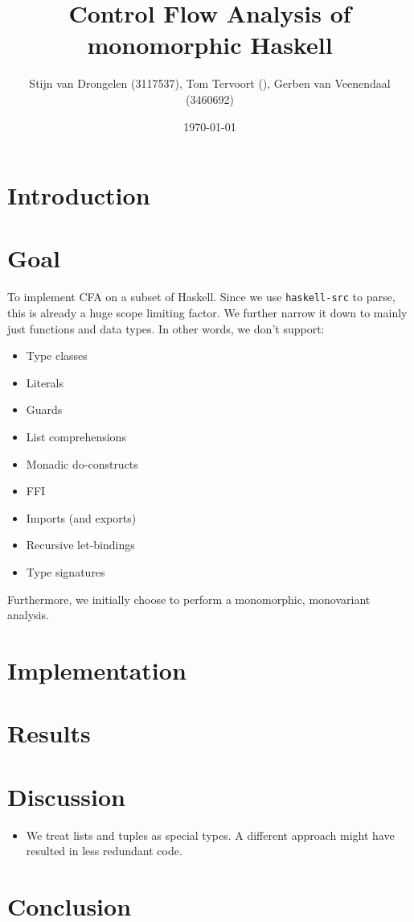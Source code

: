 \documentclass[a4paper]{scrartcl}
\title{Control Flow Analysis of monomorphic Haskell}
\author{Stijn van Drongelen {\tiny(3117537)},
        Tom Tervoort {\tiny()},
        Gerben van Veenendaal {\tiny(3460692)}}
\date{\today}
\begin{document}
\maketitle

\section{Introduction}
\section{Goal}

To implement CFA on a subset of Haskell. Since we use \texttt{haskell-src} to
parse, this is already a huge scope limiting factor. We further narrow it
down to mainly just functions and data types. In other words, we don't
support:

\begin{itemize}
\item Type classes
\item Literals
\item Guards
\item List comprehensions
\item Monadic do-constructs
\item FFI
\item Imports (and exports)
\item Recursive let-bindings
\item Type signatures
\end{itemize}

Furthermore, we initially choose to perform a monomorphic, monovariant analysis.

\section{Implementation}
\section{Results}
\section{Discussion}
\begin{itemize}
\item
    We treat lists and tuples as special types. A different approach might
    have resulted in less redundant code.
\end{itemize}

\section{Conclusion}
\end{document}
